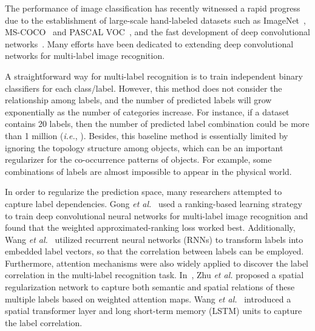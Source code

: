 \documentclass[10pt,twocolumn,letterpaper]{article}
\begin{document}
The performance of image classification has recently witnessed a rapid progress due to the establishment of large-scale hand-labeled datasets such as ImageNet~\cite{imagenet}, MS-COCO~\cite{coco} and PASCAL VOC~\cite{voc}, and the fast development of deep convolutional networks~\cite{resnet,senet,shufflenet,xception,resnext}. Many efforts have been dedicated to extending deep convolutional networks for multi-label image recognition.

A straightforward way for multi-label recognition is to train independent binary classifiers for each class/label. However, this method does not consider the relationship among labels, and the number of predicted labels will grow exponentially as the number of categories increase. For instance, if a dataset contains 20 labels, then the number of predicted label combination could be more than 1 million (\emph{i.e.}, ). Besides, this baseline method is essentially limited by ignoring the topology structure among objects, which can be an important regularizer for the co-occurrence patterns of objects. For example, some combinations of labels are almost impossible to appear in the physical world.



In order to regularize the prediction space, many researchers attempted to capture label dependencies. Gong \emph{et al.}~\cite{warp} used a ranking-based learning strategy to train deep convolutional neural networks for multi-label image recognition and found that the weighted approximated-ranking loss worked best. Additionally, Wang \emph{et al.}~\cite{cnn-rnn} utilized recurrent neural networks (RNNs) to transform labels into embedded label vectors, so that the correlation between labels can be employed. Furthermore, attention mechanisms were also widely applied to discover the label correlation in the multi-label recognition task. In~\cite{srn}, Zhu \emph{et al.} proposed a spatial regularization network to capture both semantic and spatial relations of these multiple labels based on weighted attention maps. Wang \emph{et al.}~\cite{rnn_attention} introduced a spatial transformer layer and long short-term memory (LSTM) units to capture the label correlation.
\end{document}
